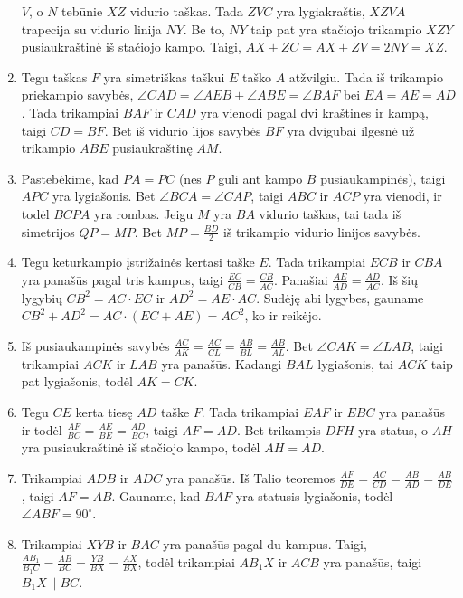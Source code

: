 \begin{enumerate}
  $V$, o $N$ tebūnie $XZ$ vidurio taškas.  Tada $ZVC$ yra lygiakraštis,
  $XZVA$ trapecija su vidurio linija $NY$. Be to, $NY$ taip pat yra
  stačiojo trikampio $XZY$ pusiaukraštinė iš stačiojo kampo. Taigi, $AX +
  ZC = AX + ZV = 2NY = XZ$.
\item
  Tegu taškas $F$ yra simetriškas taškui $E$ taško $A$ atžvilgiu. Tada iš
  trikampio priekampio savybės, $\angle CAD = \angle AEB + \angle ABE =
  \angle BAF$ bei $EA = AE = AD$.  Tada trikampiai $BAF$ ir $CAD$ yra
  vienodi pagal dvi kraštines ir kampą, taigi $CD = BF$. Bet iš vidurio
  lijos savybės $BF$ yra dvigubai ilgesnė už trikampio $ABE$
  pusiaukraštinę $AM$.
\item
  Pastebėkime, kad $PA = PC$ (nes $P$ guli ant kampo $B$ pusiaukampinės),
  taigi $APC$ yra lygiašonis. Bet $\angle BCA = \angle CAP$, taigi $ABC$
  ir $ACP$ yra vienodi, ir todėl $BCPA$ yra rombas. Jeigu $M$ yra $BA$
  vidurio taškas, tai tada iš simetrijos $QP = MP$. Bet $MP =
  \frac{BD}{2}$ iš trikampio vidurio linijos savybės.
\item
  Tegu keturkampio įstrižainės kertasi taške $E$. Tada trikampiai $ECB$ ir
  $CBA$ yra panašūs pagal tris kampus, taigi $\frac{EC}{CB} =
  \frac{CB}{AC}$.  Panašiai $\frac{AE}{AD} = \frac{AD}{AC}$. Iš šių
  lygybių $CB^2 = AC\cdot EC$ ir $AD^2 = AE\cdot AC$. Sudėję abi lygybes,
  gauname $CB^2 + AD^2 = AC \cdot (EC + AE) = AC^2$, ko ir reikėjo. 
\item
  Iš pusiaukampinės savybės $\frac{AC}{AK} = \frac{AC}{CL} = \frac{AB}{BL}
  = \frac{AB}{AL}$. Bet $\angle CAK = \angle LAB$, taigi trikampiai $ACK$
  ir $LAB$ yra panašūs.  Kadangi $BAL$ lygiašonis, tai $ACK$ taip pat
  lygiašonis, todėl $AK = CK$.
\item
  Tegu $CE$ kerta tiesę $AD$ taške $F$. Tada trikampiai $EAF$ ir $EBC$ yra
  panašūs ir todėl $\frac{AF}{BC} = \frac{AE}{BE} = \frac{AD}{BC}$, taigi
  $AF = AD$.  Bet trikampis $DFH$ yra status, o $AH$ yra pusiaukraštinė iš
  stačiojo kampo, todėl $AH = AD$. 
\item
  Trikampiai $ADB$ ir $ADC$ yra panašūs. Iš Talio teoremos $\frac{AF}{DE}
  = \frac{AC}{CD} = \frac{AB}{AD} = \frac{AB}{DE}$, taigi $AF = AB$.
  Gauname, kad $BAF$ yra statusis lygiašonis, todėl $\angle ABF =
  90^\circ$.
\item
  Trikampiai $XYB$ ir $BAC$ yra panašūs pagal du kampus.  Taigi,
  $\frac{AB_1}{B_1C} = \frac{AB}{BC} = \frac{YB}{BX} = \frac{AX}{BX}$,
  todėl trikampiai $AB_1X$ ir $ACB$ yra panašūs, taigi
  $B_1X\parallel{BC}$.
\end{enumerate} 
